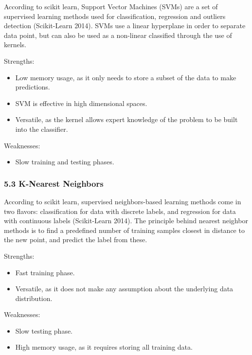 \documentclass[]{article}
\providecommand{\tightlist}{%
  \setlength{\itemsep}{0pt}\setlength{\parskip}{0pt}}
\begin{document}
According to scikit learn, Support Vector Machines (SVMs) are a set of
supervised learning methods used for classification, regression and
outliers detection (Scikit-Learn 2014). SVMs use a linear hyperplane in
order to separate data point, but can also be used as a non-linear
classified through the use of kernels.

Strengths:

\begin{itemize}
\tightlist
\item
  Low memory usage, as it only needs to store a subset of the data to
  make predictions.
\item
  SVM is effective in high dimensional spaces.
\item
  Versatile, as the kernel allows expert knowledge of the problem to be
  built into the classifier.
\end{itemize}

Weaknesses:

\begin{itemize}
\tightlist
\item
  Slow training and testing phases.
\end{itemize}

\subsubsection{5.3 K-Nearest Neighbors}\label{k-nearest-neighbors}

According to scikit learn, supervised neighbors-based learning methods
come in two flavors: classification for data with discrete labels, and
regression for data with continuous labels (Scikit-Learn 2014). The
principle behind nearest neighbor methods is to find a predefined number
of training samples closest in distance to the new point, and predict
the label from these.

Strengths:

\begin{itemize}
\tightlist
\item
  Fast training phase.
\item
  Versatile, as it does not make any assumption about the underlying
  data distribution.
\end{itemize}

Weaknesses:

\begin{itemize}
\tightlist
\item
  Slow testing phase.
\item
  High memory usage, as it requires storing all training data.
\end{itemize}
\end{document}
